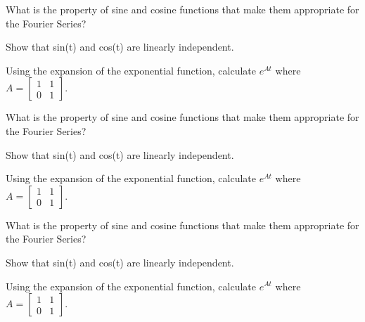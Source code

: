 \documentclass[12pt,letterpaper, onecolumn]{exam}
\begin{document}
\begin{questions}
    \question[3 Marks] What is the property of sine and cosine functions that make them appropriate for the Fourier Series?\droppoints

    \question[3 Marks] Show that sin(t) and cos(t) are linearly independent.\droppoints
    
    \question[4 Marks] Using the expansion of the exponential function, calculate $e^{At}$ where $A = \begin{bmatrix} 1 & 1 \\ 0 & 1\end{bmatrix}$.\droppoints
    
    \question[3 Marks] What is the property of sine and cosine functions that make them appropriate for the Fourier Series?\droppoints

    \question[3 Marks] Show that sin(t) and cos(t) are linearly independent.\droppoints
    
    \question[4 Marks] Using the expansion of the exponential function, calculate $e^{At}$ where $A = \begin{bmatrix} 1 & 1 \\ 0 & 1\end{bmatrix}$.\droppoints
    
    \question[3 Marks] What is the property of sine and cosine functions that make them appropriate for the Fourier Series?\droppoints

    \question[3 Marks] Show that sin(t) and cos(t) are linearly independent.\droppoints
    
    \question[4 Marks] Using the expansion of the exponential function, calculate $e^{At}$ where $A = \begin{bmatrix} 1 & 1 \\ 0 & 1\end{bmatrix}$.\droppoints
    
\end{questions}
\end{document}
